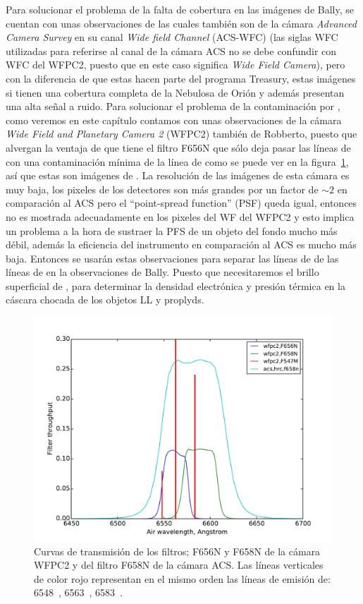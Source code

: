  Para solucionar el problema de la falta de cobertura en las imágenes de Bally, se cuentan con unas observaciones de \citet{Robberto:2013a} las cuales también son de la cámara \textit{Advanced Camera Survey} en su canal \textit{Wide field Channel} (ACS-WFC) (las siglas WFC utilizadas para referirse al canal de la cámara ACS no se debe confundir con WFC del WFPC2, puesto que en este caso significa \textit{Wide Field Camera}), pero con la diferencia de que estas hacen parte del programa Treasury, estas imágenes si tienen una cobertura completa de la Nebulosa de Orión y además presentan una alta señal a ruido. Para solucionar el problema de la contaminación por \nii{}, como veremos en este capítulo contamos con unas observaciones de la cámara  \textit{Wide Field and Planetary Camera 2} (WFPC2) también de Robberto, puesto que alvergan la ventaja de que tiene el filtro F656N que sólo deja pasar las líneas de \ha{} con una contaminación mínima de la línea de \nii{} como se puede ver en la figura~\ref{fig:transmision}, así que estas son imágenes de \ha{}. La resolución de las imágenes de esta cámara es muy baja, los pixeles de los detectores son más grandes por un factor de \(\sim2\) en comparación al ACS pero el ``point-spread function'' (PSF) queda igual, entonces no es mostrada adecuadamente en los pixeles del WF del WFPC2 y esto implica un problema a la hora de sustraer la PFS de un objeto del fondo mucho más débil, además la eficiencia del instrumento en comparación al ACS es mucho más baja. Entonces se usarán estas observaciones para separar las líneas de \ha{} de las líneas de \nii{} en la observaciones de Bally. Puesto que necesitaremos el brillo superficial de \ha{}, para determinar la densidad electrónica y presión térmica en la cáscara chocada de los objetos LL y proplyds.\\

 \begin{figure}
   \centering
    \includegraphics[width=\linewidth, trim=0.7 0.7 0.7 30, clip]{luis-programas/will-filter}
   \caption{Curvas de transmisión de los filtros; F656N y F658N  de la cámara WFPC2 y del filtro F658N de la cámara ACS. Las líneas verticales de color rojo representan en el mismo orden las líneas de emisión de: \nii{} 6548~\A{}, \ha{} 6563~\A{}, \nii{} 6583~\A{}. }
   \label{fig:transmision}
 \end{figure}

